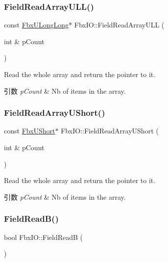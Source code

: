 \subsubsection{\texorpdfstring{Field\+Read\+Array\+U\+L\+L()}{FieldReadArrayULL()}}
{\footnotesize\ttfamily const \hyperlink{fbxtypes_8h_a267f848573cc1e685aa510be4b1298c8}{Fbx\+U\+Long\+Long}$\ast$ Fbx\+I\+O\+::\+Field\+Read\+Array\+U\+LL (\begin{DoxyParamCaption}\item[{int \&}]{p\+Count }\end{DoxyParamCaption})}

Read the whole array and return the pointer to it. 
\begin{DoxyParams}{引数}
{\em p\+Count} & Nb of items in the array. \\
\hline
\end{DoxyParams}
\mbox{\label{class_fbx_i_o_a4360cbf914839a3fbaa0eedf824f5ded}} 
\subsubsection{\texorpdfstring{Field\+Read\+Array\+U\+Short()}{FieldReadArrayUShort()}}
{\footnotesize\ttfamily const \hyperlink{fbxtypes_8h_a321ef060885fc068fd77ac69a49f51d9}{Fbx\+U\+Short}$\ast$ Fbx\+I\+O\+::\+Field\+Read\+Array\+U\+Short (\begin{DoxyParamCaption}\item[{int \&}]{p\+Count }\end{DoxyParamCaption})}

Read the whole array and return the pointer to it. 
\begin{DoxyParams}{引数}
{\em p\+Count} & Nb of items in the array. \\
\hline
\end{DoxyParams}
\mbox{\label{class_fbx_i_o_a1007e4bf089c93e7f49988fa7087a202}} 
\subsubsection{\texorpdfstring{Field\+Read\+B()}{FieldReadB()}\hspace{0.1cm}{\footnotesize\ttfamily [1/2]}}
{\footnotesize\ttfamily bool Fbx\+I\+O\+::\+Field\+ReadB (\begin{DoxyParamCaption}{ }\end{DoxyParamCaption})}




